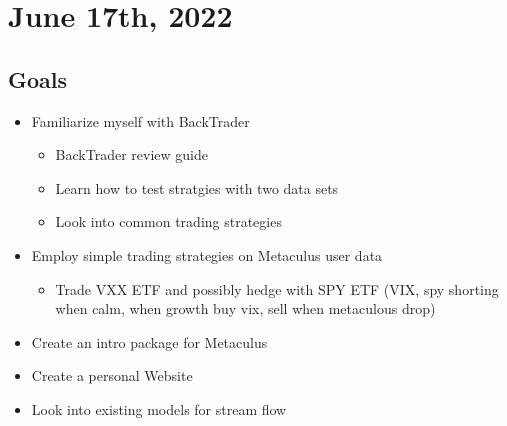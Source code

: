 \documentclass{article}
\begin{document}
\section{June 17th, 2022}
\subsection*{Goals}
\begin{itemize}
    \item Familiarize myself with BackTrader
    \begin{itemize}
        \item BackTrader review guide
        \item Learn how to test stratgies with two data sets
        \item Look into common trading strategies
    \end{itemize}
    \item Employ simple trading strategies on Metaculus user data 
    \begin{itemize}
        \item Trade VXX ETF and possibly hedge with SPY ETF (VIX, spy shorting when calm, when growth buy vix, sell when metaculous drop)
    \end{itemize}
    \item Create an intro package for Metaculus
    \item Create a personal Website
    \item Look into existing models for stream flow
\end{itemize}
\end{document}
